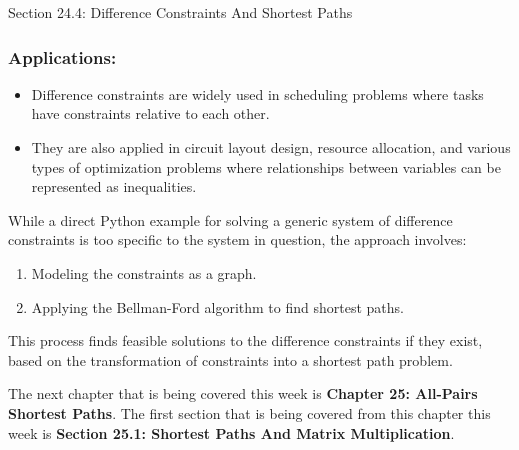 \begin{notes}{Section 24.4: Difference Constraints And Shortest Paths}
    \subsubsection*{Applications:}
    
    \begin{itemize}
        \item Difference constraints are widely used in scheduling problems where tasks have constraints relative to each other.
        \item They are also applied in circuit layout design, resource allocation, and various types of optimization problems where relationships between variables can be represented as inequalities.
    \end{itemize}
    
    \begin{highlight}
    
    While a direct Python example for solving a generic system of difference constraints is too specific to the system in question, the approach involves:
    \begin{enumerate}
        \item Modeling the constraints as a graph.
        \item Applying the Bellman-Ford algorithm to find shortest paths.
    \end{enumerate}
    This process finds feasible solutions to the difference constraints if they exist, based on the transformation of constraints into a shortest path problem.
    \end{highlight}
\end{notes}

The next chapter that is being covered this week is \textbf{Chapter 25: All-Pairs Shortest Paths}. The first section that is being covered from this chapter this week is \textbf{Section 25.1: Shortest Paths And Matrix Multiplication}.

